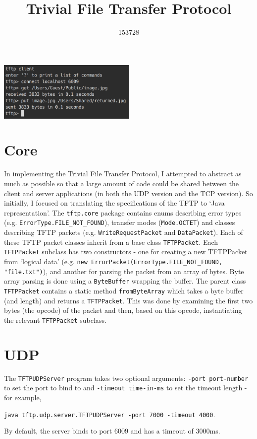 \documentclass[a4paper]{article}
\title{\vspace{-5ex}Trivial File Transfer Protocol}
\author{153728}
\date{}
\newcommand{\code}{\texttt}
\begin{document}
\maketitle
\vspace{-4ex}
\noindent

\begin{center}
\includegraphics[width=0.5\textwidth]{image}
\end{center}

\section{Core}

In implementing the Trivial File Transfer Protocol, I attempted to abstract as much as possible so that a large amount of code could be shared between the client and server applications (in both the UDP version and the TCP version). So initially, I focused on translating the specifications of the TFTP to `Java representation'. The \code{tftp.core} package contains enums describing error types (e.g. \code{ErrorType.FILE\_NOT\_FOUND}), transfer modes (\code{Mode.OCTET}) and classes describing TFTP packets (e.g. \code{WriteRequestPacket} and \code{DataPacket}). Each of these TFTP packet classes inherit from a base class \code{TFTPPacket}. Each \code{TFTPPacket} subclass has two constructors - one for creating a new TFTPPacket from `logical data' (e.g. \code{new ErrorPacket(ErrorType.FILE\_NOT\_FOUND, "file.txt")}), and another for parsing the packet from an array of bytes. Byte array parsing is done using a \code{ByteBuffer} wrapping the buffer. The parent class \code{TFTPPacket} contains a static method \code{fromByteArray} which takes a byte buffer (and length) and returns a \code{TFTPPacket}. This was done by examining the first two bytes (the opcode) of the packet and then, based on this opcode, instantiating the relevant \code{TFTPPacket} subclass.

\section{UDP}

The \code{TFTPUDPServer} program takes two optional arguments: \code{-port port-number} to set the port to bind to and \code{-timeout time-in-ms} to set the timeout length - for example,
\begin{center}
\code{java tftp.udp.server.TFTPUDPServer -port 7000 -timeout 4000}.
\end{center}
By default, the server binds to port 6009 and has a timeout of 3000ms.
\end{document}
